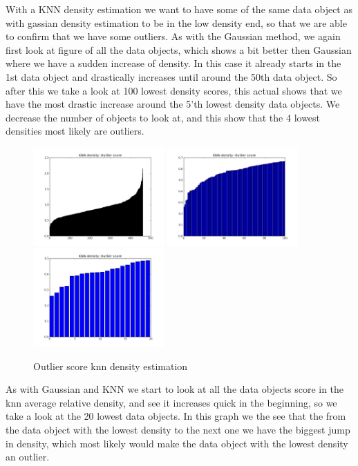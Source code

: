 With a KNN density estimation we want to have some of the same data object as with gassian density estimation to be in the low density end, so that we are able to confirm that we have some outliers. As with the Gaussian method, we again first look at figure of all the data objects, which shows a bit better then Gaussian where we have a sudden increase of density. In this case it already starts in the 1st data object and drastically increases until around the 50th data object. So after this we take a look at 100 lowest density scores, this actual shows that we have the most drastic increase around the 5'th lowest density data objects. We decrease the number of objects to look at, and this show that the 4 lowest densities most likely are outliers.

\begin{figure}[H]
\centering
\includegraphics[width=5cm, keepaspectratio=true]{pictures/knndensityEstimationAll.png}
\includegraphics[width=5cm, keepaspectratio=true]{pictures/knndensityEstimation100.png}
\includegraphics[width=5cm, keepaspectratio=true]{pictures/knndensityEstimation20.png}
\vspace{-0.4cm}
\caption{\footnotesize Outlier score knn density estimation}
\label{knn}
\end{figure}

As with Gaussian and KNN we start to look at all the data objects score in the knn average relative density, and see it increases quick in the beginning, so we take a look at the 20 lowest data objects. In this graph we the see that the from the data object with the lowest density to the next one we have the biggest jump in density, which most likely would make the data object with the lowest density an outlier.

